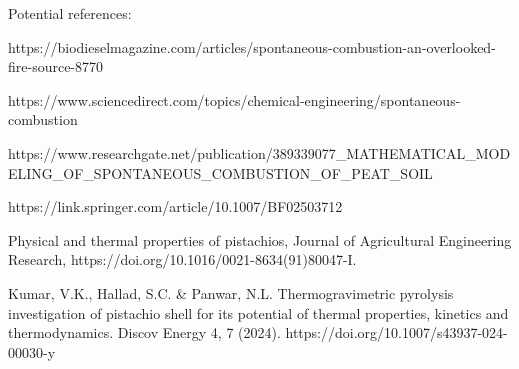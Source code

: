 Potential references:

https://biodieselmagazine.com/articles/spontaneous-combustion-an-overlooked-fire-source-8770

https://www.sciencedirect.com/topics/chemical-engineering/spontaneous-combustion

https://www.researchgate.net/publication/389339077_MATHEMATICAL_MODELING_OF_SPONTANEOUS_COMBUSTION_OF_PEAT_SOIL

https://link.springer.com/article/10.1007/BF02503712

Physical and thermal properties of pistachios,
Journal of Agricultural Engineering Research,
https://doi.org/10.1016/0021-8634(91)80047-I.

Kumar, V.K., Hallad, S.C. & Panwar, N.L. Thermogravimetric pyrolysis investigation of pistachio shell for its potential of thermal properties, kinetics and thermodynamics. Discov Energy 4, 7 (2024). https://doi.org/10.1007/s43937-024-00030-y